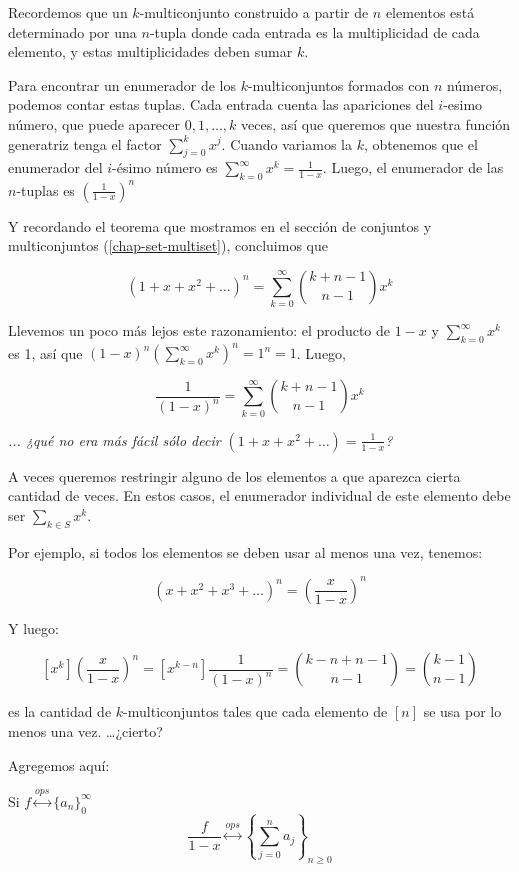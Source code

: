 \begin{example}
\label{example-combi-002}
Recordemos que un $k$-multiconjunto
construido a partir de $n$ elementos está
determinado por una $n$-tupla donde cada
entrada es la multiplicidad de cada elemento,
y estas multiplicidades deben sumar $k$.

Para encontrar un enumerador de los
$k$-multiconjuntos formados con $n$ números,
podemos contar estas tuplas. Cada entrada
cuenta las apariciones del $i$-esimo número,
que puede aparecer $0,1, \ldots,k$ veces, así
que queremos que nuestra función generatriz
tenga el factor $ \sum_{j = 0}^kx^j$. Cuando
variamos la $k$, obtenemos que el enumerador
del $i$-ésimo número es $ \sum_{k = 0}^\infty
x^k =  \frac{1}{1-x}$. Luego, el enumerador
de las $n$-tuplas es $ \left( \frac{1}{1-x}
\right)^n$

Y recordando el teorema que mostramos en el
sección de
conjuntos y multiconjuntos
(\ref{chap-set-multiset}), concluimos que

$$
(1 + x + x^2 +  \ldots)^n =  \sum_{k =
0}^\infty {k + n-1 \choose n-1}x^k
$$

Llevemos un poco más lejos este razonamiento:
el producto de $1-x$ y $ \sum_{k = 0}^\infty
x^k$ es 1, así que $(1-x)^n \left( \sum_{k =
0}^\infty x^k \right)^n = 1^n = 1$. Luego,

$$
 \frac{1}{(1-x)^n} =  \sum_{k = 0}^\infty {k
+ n-1 \choose n-1}x^k
$$

\emph{... ¿qué no era más fácil sólo decir
$(1 + x + x^2 +  \ldots) =  \frac{1}{1-x}$?}
\end{example}
\begin{example}\label{restr}
A veces queremos restringir alguno de los
elementos a que aparezca cierta cantidad de
veces. En estos casos, el enumerador
individual de este elemento debe ser $
\sum_{k\in S}x^k$.

Por ejemplo, si todos los elementos se deben
usar al menos una vez, tenemos:

$$
(x + x^2 + x^3 +  \ldots)^n =  \left(
\frac{x}{1-x} \right)^n
$$

Y luego:

$$
[x^k] \left( \frac{x}{1-x} \right)^n =
[x^{k-n}] \frac{1}{(1-x)^n} = {k-n + n-1
\choose n-1} = {k-1 \choose n-1}
$$

es la cantidad de $k$-multiconjuntos tales
que cada elemento de $[n]$ se usa por lo
menos una vez. …¿cierto?
\end{example}
Agregemos aquí:
\begin{theorem}[Regla 5]\label{rule5}
Si
$f
\overset{ops}{\longleftrightarrow}
\{a_n\}_0^\infty$
$$
\frac{f}{1-x}
\overset{ops}{\longleftrightarrow}
\left\{ \sum_{j = 0}^na_j \right\}_{n\geq0}
$$

\end{theorem}
